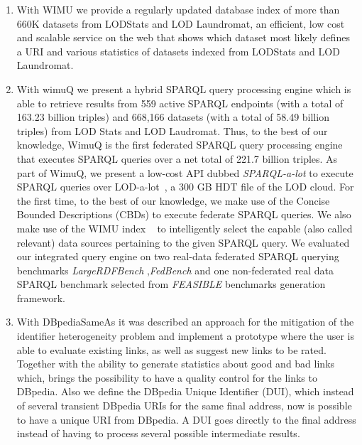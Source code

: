 \begin{enumerate}
    \item With WIMU\cite{valdestilhas2018my} we provide a regularly updated database index of more than 660K datasets from LODStats and LOD Laundromat, an efficient, low cost and scalable service on the web that shows which dataset most likely defines a URI and various statistics of datasets indexed from LODStats and LOD Laundromat.
    
    \item With wimuQ\cite{ValdestilhasKcap} we present a hybrid SPARQL query processing engine which is able to retrieve results from 559 active SPARQL endpoints (with a total of 163.23 billion triples) and 668,166 datasets (with a total of 58.49 billion triples) from LOD Stats and LOD Laudromat. Thus, to the best of our knowledge, WimuQ is the first federated SPARQL query processing engine that executes SPARQL queries over a net total of 221.7 billion triples. As part of WimuQ, we present a low-cost API dubbed \emph{SPARQL-a-lot} to execute SPARQL queries over LOD-a-lot~\cite{fernandez2017lod}, a 300 GB HDT file of the LOD cloud. For the first time, to the best of our knowledge, we make use of the Concise Bounded Descriptions (CBDs) to execute federate SPARQL queries. We also make use of the WIMU index ~\cite{valdestilhas2018my} to intelligently select the capable (also called relevant) \cite{hibiscus2014} data sources pertaining to the given SPARQL query. We evaluated our integrated query engine on two real-data federated SPARQL querying benchmarks \emph{LargeRDFBench} \cite{largerdfbench2017},\emph{FedBench} \cite{fedbench2011} and one non-federated real data SPARQL benchmark selected from \emph{FEASIBLE} \cite{feasible2015} benchmarks generation framework.
    
    \item With DBpediaSameAs\cite{valdestilhas2015dbpediasameas} it was described an approach for the mitigation of the identifier heterogeneity problem and implement a prototype where the user is able to evaluate existing links, as well as suggest new links to be rated. Together with the ability to generate statistics about good and bad links which, brings the possibility to have a quality control for the links to DBpedia. Also we define the DBpedia Unique Identifier (DUI), which instead of several transient  DBpedia URIs for the same final address, now is possible to have a unique URI from DBpedia. A DUI goes directly to the final address instead of having to process several possible intermediate results.
    

\end{enumerate}
